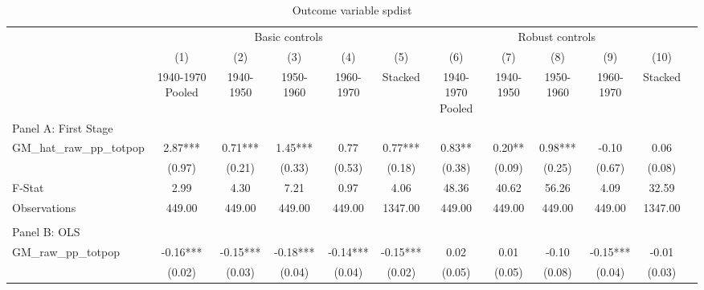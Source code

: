  \begin{table}[htbp]\centering {} \begin{threeparttable} \caption{Outcome variable spdist} \begin{tabular}{l*{11}{c}} \toprule
          &\multicolumn{5}{c}{Basic controls}                                   &\multicolumn{5}{c}{Robust controls}                                  \\\cmidrule(lr){2-6}\cmidrule(lr){7-11}
          &\multicolumn{1}{c}{(1)}&\multicolumn{1}{c}{(2)}&\multicolumn{1}{c}{(3)}&\multicolumn{1}{c}{(4)}&\multicolumn{1}{c}{(5)}&\multicolumn{1}{c}{(6)}&\multicolumn{1}{c}{(7)}&\multicolumn{1}{c}{(8)}&\multicolumn{1}{c}{(9)}&\multicolumn{1}{c}{(10)}\\
          &\multicolumn{1}{c}{1940-1970 Pooled}&\multicolumn{1}{c}{1940-1950}&\multicolumn{1}{c}{1950-1960}&\multicolumn{1}{c}{1960-1970}&\multicolumn{1}{c}{Stacked}&\multicolumn{1}{c}{1940-1970 Pooled}&\multicolumn{1}{c}{1940-1950}&\multicolumn{1}{c}{1950-1960}&\multicolumn{1}{c}{1960-1970}&\multicolumn{1}{c}{Stacked}\\
\cmidrule(lr){1-11}
\multicolumn{10}{l}{Panel A: First Stage}\\
\cmidrule(lr){1-11}
GM\_hat\_raw\_pp\_totpop&      2.87***&      0.71***&      1.45***&      0.77   &      0.77***&      0.83** &      0.20** &      0.98***&     -0.10   &      0.06   \\
          &    (0.97)   &    (0.21)   &    (0.33)   &    (0.53)   &    (0.18)   &    (0.38)   &    (0.09)   &    (0.25)   &    (0.67)   &    (0.08)   \\
\midrule
F-Stat    &      2.99   &      4.30   &      7.21   &      0.97   &      4.06   &     48.36   &     40.62   &     56.26   &      4.09   &     32.59   \\
Observations&    449.00   &    449.00   &    449.00   &    449.00   &   1347.00   &    449.00   &    449.00   &    449.00   &    449.00   &   1347.00   \\
\cmidrule[\heavyrulewidth](lr){1-11} \\ \cmidrule[\heavyrulewidth](lr){1-11}
\multicolumn{10}{l}{Panel B: OLS}\\
\cmidrule(lr){1-11}
GM\_raw\_pp\_totpop&     -0.16***&     -0.15***&     -0.18***&     -0.14***&     -0.15***&      0.02   &      0.01   &     -0.10   &     -0.15***&     -0.01   \\
          &    (0.02)   &    (0.03)   &    (0.04)   &    (0.04)   &    (0.02)   &    (0.05)   &    (0.05)   &    (0.08)   &    (0.04)   &    (0.03)   \\

\end{tabular}
\end{threeparttable}
\end{table}
